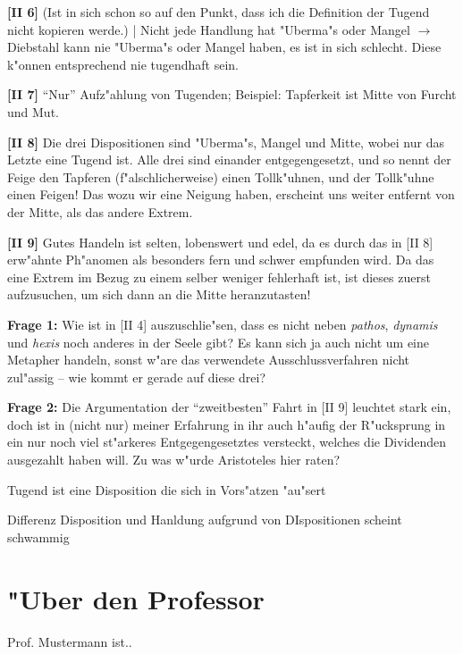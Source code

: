 \documentclass[emulatestandardclasses]{scrartcl}
\begin{document}
\noindent \textbf{[II 6]} (Ist in sich schon so auf den Punkt, dass ich die Definition der Tugend nicht kopieren werde.) | Nicht jede Handlung hat "Uberma"s oder Mangel $\rightarrow$ Diebstahl kann nie "Uberma"s oder Mangel haben, es ist in sich schlecht. Diese k"onnen entsprechend nie tugendhaft sein.\newline

\noindent \textbf{[II 7]} "`Nur"' Aufz"ahlung von Tugenden; Beispiel: Tapferkeit ist Mitte von Furcht und Mut.\newline

\noindent \textbf{[II 8]} Die drei Dispositionen sind "Uberma"s, Mangel und Mitte, wobei nur das Letzte eine Tugend ist. Alle drei sind einander entgegengesetzt, und so nennt der Feige den Tapferen (f"alschlicherweise) einen Tollk"uhnen, und der Tollk"uhne einen Feigen! Das wozu wir eine Neigung haben, erscheint uns weiter entfernt von der Mitte, als das andere Extrem.\newline

\noindent \textbf{[II 9]} Gutes Handeln ist selten, lobenswert und edel, da es durch das in [II 8] erw"ahnte Ph"anomen als besonders fern und schwer empfunden wird. Da das eine Extrem im Bezug zu einem selber weniger fehlerhaft ist, ist dieses zuerst aufzusuchen, um sich dann an die Mitte heranzutasten!\newline


\noindent \textbf{Frage 1:} Wie ist in [II 4] auszuschlie"sen, dass es nicht neben \emph{pathos}, \emph{dynamis} und \emph{hexis} noch anderes in der Seele gibt? Es kann sich ja auch nicht um eine Metapher handeln, sonst w"are das verwendete Ausschlussverfahren nicht zul"assig -- wie kommt er gerade auf diese drei?\newline

\noindent \textbf{Frage 2:} Die Argumentation der "`zweitbesten"' Fahrt in [II 9] leuchtet stark ein, doch ist in (nicht nur) meiner Erfahrung in ihr auch h"aufig der R"ucksprung in ein nur noch viel st"arkeres Entgegengesetztes versteckt, welches die Dividenden ausgezahlt haben will. Zu was w"urde Aristoteles hier raten?

Tugend ist eine Disposition die sich in Vors"atzen "au"sert

Differenz Disposition und Hanldung aufgrund von DIspositionen scheint schwammig



\newpage
\section{"Uber den Professor}
Prof. Mustermann ist..


\end{document}
